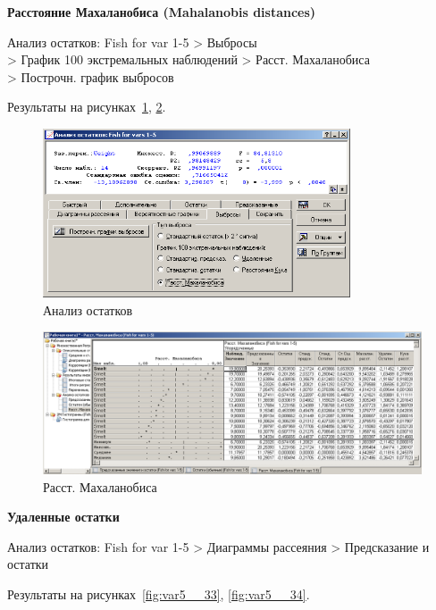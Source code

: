 \textbf{Расстояние Махаланобиса (Mahalanobis distances)}

Анализ остатков: Fish for var 1-5 > Выбросы\\
> График 100 экстремальных наблюдений > Расст. Махаланобиса\\
> Построчн. график выбросов

Результаты на рисунках~\ref{fig:var5__31}, \ref{fig:var5__32}.

\begin{figure}[!h]
  \centering

  \includegraphics[height=5cm]
  {inc/var5__31.PNG}

  \caption{Анализ остатков}

  \label{fig:var5__31}
\end{figure}

\begin{figure}[!h]
  \centering

  \includegraphics[width=16cm]
  {inc/var5__32.PNG}

  \caption{Расст. Махаланобиса}

  \label{fig:var5__32}
\end{figure}

\newpage

\textbf{Удаленные остатки}

Анализ остатков: Fish for var 1-5 > Диаграммы рассеяния >  Предсказание и остатки

Результаты на рисунках~\ref{fig:var5__33}, \ref{fig:var5__34}.

